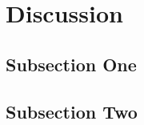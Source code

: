 



\maketitle




\section{Discussion}

\subsection{Subsection One}

\blindtext %

\subsection{Subsection Two}

\begin{thebibliography}{99} 

\end{thebibliography}


